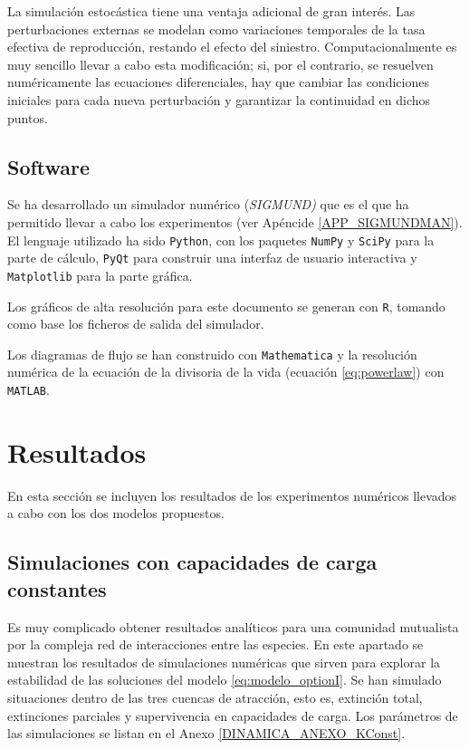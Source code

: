 La simulación estocástica tiene una ventaja adicional de gran interés. Las perturbaciones externas se modelan como variaciones temporales de la tasa efectiva de reproducción, restando el efecto del siniestro. Computacionalmente es muy sencillo llevar a cabo esta modificación; si, por el contrario, se resuelven numéricamente las ecuaciones diferenciales, hay que cambiar las condiciones iniciales para cada nueva perturbación y garantizar la continuidad en dichos puntos.

\subsection{Software}
Se ha desarrollado un simulador numérico (\textit{SIGMUND)} que es el que ha permitido llevar a cabo los experimentos (ver Apéncide \ref{APP_SIGMUNDMAN}). El lenguaje utilizado ha sido \texttt{Python}, con los paquetes \texttt{NumPy} y \texttt{SciPy} para la parte de cálculo, \texttt{PyQt} para construir una interfaz de usuario interactiva y \texttt{Matplotlib} para la parte gráfica.

Los gráficos de alta resolución para este documento se generan con \texttt{R}, tomando como base los ficheros de salida del simulador. 

Los diagramas de flujo se han construido con \texttt{Mathematica} y la resolución numérica de la ecuación de la divisoria de la vida (ecuación \ref{eq:powerlaw}) con \texttt{MATLAB}.

\section{Resultados}

En esta sección se incluyen los resultados de los experimentos numéricos llevados a cabo con los dos modelos propuestos.

\subsection{Simulaciones con capacidades de carga constantes}
\label{results_K_constante}
Es muy complicado obtener resultados analíticos para una comunidad mutualista por la compleja red de interacciones entre las especies. En este apartado se muestran los resultados de simulaciones numéricas que sirven para explorar la estabilidad de las soluciones del modelo \ref{eq:modelo_optionI}. Se han simulado situaciones dentro de las tres cuencas de atracción, esto es, extinción total, extinciones parciales y supervivencia en capacidades de carga. Los parámetros de las simulaciones se listan en el Anexo \ref{DINAMICA_ANEXO_KConst}.

